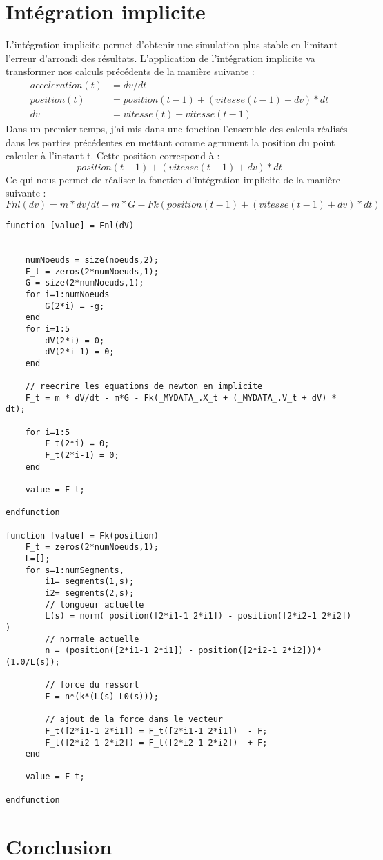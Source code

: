 \documentclass[a4paper,11pt]{article}
\begin{document}
\section{Intégration implicite}
L'intégration implicite permet d'obtenir une simulation plus stable en limitant l'erreur d'arrondi
des résultats. L'application de l'intégration implicite va transformer nos calculs précédents de 
la manière suivante :
\begin{align}
  acceleration(t) &= dv / dt\\
  position(t) &= position(t-1) + (vitesse(t-1) + dv) * dt\\
  dv &= vitesse(t) - vitesse(t-1) 
\end{align}
Dans un premier temps, j'ai mis dans une fonction l'ensemble des calculs réalisés
dans les parties précédentes en mettant comme agrument la position du point calculer à l'instant t.
Cette position correspond à :
\begin{equation}
  position(t-1) + (vitesse(t-1) + dv)*dt
\end{equation}
Ce qui nous permet de réaliser la fonction d'intégration implicite de la manière suivante :
\begin{equation}
  Fnl(dv) = m * dv/dt - m*G - Fk(position(t-1) + (vitesse(t-1) + dv)*dt)
\end{equation}
\begin{lstlisting}[caption=Fonction permettant de réaliser l'intégration implicite]
function [value] = Fnl(dV)
    

    numNoeuds = size(noeuds,2);  
    F_t = zeros(2*numNoeuds,1);
    G = size(2*numNoeuds,1);
    for i=1:numNoeuds
        G(2*i) = -g;
    end
    for i=1:5
        dV(2*i) = 0;
        dV(2*i-1) = 0;
    end
    
    // reecrire les equations de newton en implicite
    F_t = m * dV/dt - m*G - Fk(_MYDATA_.X_t + (_MYDATA_.V_t + dV) * dt);
    
    for i=1:5
        F_t(2*i) = 0;
        F_t(2*i-1) = 0;
    end
    
    value = F_t;
    
endfunction

function [value] = Fk(position)
    F_t = zeros(2*numNoeuds,1);
    L=[];
    for s=1:numSegments,
        i1= segments(1,s);
        i2= segments(2,s);
        // longueur actuelle
        L(s) = norm( position([2*i1-1 2*i1]) - position([2*i2-1 2*i2]) )
        // normale actuelle
        n = (position([2*i1-1 2*i1]) - position([2*i2-1 2*i2]))*(1.0/L(s));
   
        // force du ressort
        F = n*(k*(L(s)-L0(s)));
        
        // ajout de la force dans le vecteur
        F_t([2*i1-1 2*i1]) = F_t([2*i1-1 2*i1])  - F;
        F_t([2*i2-1 2*i2]) = F_t([2*i2-1 2*i2])  + F;
    end
    
    value = F_t;

endfunction
\end{lstlisting}

\section{Conclusion}
\end{document}
